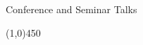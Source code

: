 \documentclass[10pt]{article}
\begin{document}
\bigskip
\noindent
{\large \sc Conference and Seminar Talks}

\vspace{-0.1in}
\noindent
\line(1,0){450}
\smallskip

%
%
%
%
%
%
%
%
%
%
%
\end{document}
